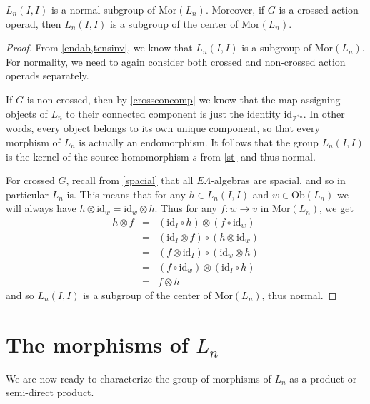 \documentclass{amsbook} %
\numberwithin{section}{chapter}
\begin{document}
\begin{prop} \label{endnorm} $L_n(I,I)$ is a normal subgroup of $\mathrm{Mor}(L_n)$. Moreover, if $G$ is a crossed action operad, then $L_n(I,I)$ is a subgroup of the center of $\mathrm{Mor}(L_n)$.
\end{prop}
\begin{proof}
From \cref{endab,tensinv}, we know that $L_n(I,I)$ is a subgroup of $\mathrm{Mor}(L_n)$. For normality, we need to again consider both crossed and non-crossed action operads separately. 

If $G$ is non-crossed, then by \cref{crossconcomp} we know that the map assigning objects of $L_n$ to their connected component is just the identity $\mathrm{id}_{\mathbb{Z}^{\ast n}}$. In other words, every object belongs to its own unique component, so that every morphism of $L_n$ is actually an endomorphism. It follows that the group $L_n(I,I)$ is the kernel of the source homomorphism $s$ from \cref{st} and thus normal.

For crossed $G$, recall from \cref{spacial} that all $E\Lambda$-algebras are spacial, and so in particular $L_n$ is. This means that for any $h \in L_n(I,I)$ and $w \in \mathrm{Ob}(L_n)$ we will always have $h \otimes \mathrm{id}_w = \mathrm{id}_w \otimes h$. Thus for any $f:w \to v$ in $\mathrm{Mor}(L_n)$, we get
\[ \begin{array}{rll}
		h \otimes f & = & (\mathrm{id}_I \circ h) \otimes (f \circ \mathrm{id}_w) \\
		& = & (\mathrm{id}_I \otimes f) \circ (h \otimes \mathrm{id}_w) \\
		& = & (f \otimes \mathrm{id}_I) \circ (\mathrm{id}_w \otimes h) \\
		& = & (f \circ \mathrm{id}_w) \otimes (\mathrm{id}_I \circ h) \\
		& = & f \otimes h
		\end{array}
\]
and so $L_n(I,I)$ is a subgroup of the center of $\mathrm{Mor}(L_n)$, thus normal. 
\end{proof}

\section{The morphisms of \texorpdfstring{$L_n$}{L_n}} 

We are now ready to characterize the group of morphisms of $L_n$ as a product or semi-direct product.
\end{document}
